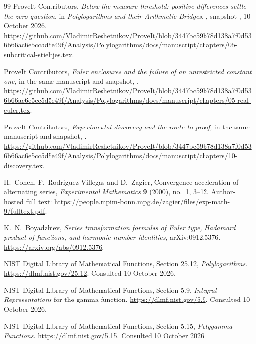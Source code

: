 \begin{thebibliography}{99}
ProveIt Contributors,
\emph{Below the measure threshold: positive differences settle the zero question},
in \emph{Polylogarithms and their Arithmetic Bridges},
, snapshot
, 10 October 2026.
\url{https://github.com/VladimirReshetnikov/ProveIt/blob/3447bc59b78d138a7f0d536b66ac6e5cc5d5e49f/Analysis/Polylogarithms/docs/manuscript/chapters/05-subcritical-stieltjes.tex}.

ProveIt Contributors,
\emph{Euler enclosures and the failure of an unrestricted constant one},
in the same manuscript and snapshot,
.
\url{https://github.com/VladimirReshetnikov/ProveIt/blob/3447bc59b78d138a7f0d536b66ac6e5cc5d5e49f/Analysis/Polylogarithms/docs/manuscript/chapters/05-real-euler.tex}.

ProveIt Contributors,
\emph{Experimental discovery and the route to proof},
in the same manuscript and snapshot,
.
\url{https://github.com/VladimirReshetnikov/ProveIt/blob/3447bc59b78d138a7f0d536b66ac6e5cc5d5e49f/Analysis/Polylogarithms/docs/manuscript/chapters/10-discovery.tex}.

H.~Cohen, F.~Rodriguez Villegas and D.~Zagier,
Convergence acceleration of alternating series,
\emph{Experimental Mathematics} \textbf{9} (2000), no.~1, 3--12.
Author-hosted full text:
\url{https://people.mpim-bonn.mpg.de/zagier/files/exp-math-9/fulltext.pdf}.

K.~N.~Boyadzhiev,
\emph{Series transformation formulas of Euler type, Hadamard product of functions, and harmonic number identities},
arXiv:0912.5376.
\url{https://arxiv.org/abs/0912.5376}.

NIST Digital Library of Mathematical Functions,
Section 25.12, \emph{Polylogarithms}.
\url{https://dlmf.nist.gov/25.12}. Consulted 10 October 2026.

NIST Digital Library of Mathematical Functions,
Section 5.9, \emph{Integral Representations} for the gamma function.
\url{https://dlmf.nist.gov/5.9}. Consulted 10 October 2026.

NIST Digital Library of Mathematical Functions,
Section 5.15, \emph{Polygamma Functions}.
\url{https://dlmf.nist.gov/5.15}. Consulted 10 October 2026.
\end{thebibliography}

